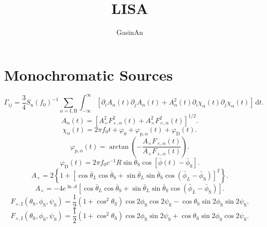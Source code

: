 \documentclass[a3paper]{ctexart}
\title{LISA}
\author{GasinAn}
\def\d{\mathrm{d}}
\begin{document}
    \maketitle
    \section{Monochromatic Sources}
    \begin{equation*}
        \Gamma_{ij}=\frac{3}{4}S_\text{n}(f_0)^{-1}\sum_{\alpha=\text{I},\text{II}}\int_{-\infty}^{\infty}\left[\partial_i A_\alpha(t)\partial_j A_\alpha(t)+A^2_\alpha(t)\partial_i \chi_\alpha(t)\partial_j \chi_\alpha(t)\right]\,\d t.
    \end{equation*}
    \begin{equation*}
        A_\alpha(t)=\left[A_+^2F_{+,\alpha}^2(t)+A_\times^2F_{\times,\alpha}^2(t)\right]^{1/2}.
    \end{equation*}
    \begin{equation*}
        \chi_\alpha(t)=2\pi f_0t+\varphi_0+\varphi_{\text{p},\alpha}(t)+\varphi_\text{D}(t).
    \end{equation*}
    \begin{equation*}
        \varphi_{\text{p},\alpha}(t)=\arctan\left(-\frac{A_\times F_{\times,\alpha}(t)}{A_+F_{+,\alpha}(t)}\right).
    \end{equation*}
    \begin{equation*}
        \varphi_\text{D}(t)=2\pi f_0c^{-1}R\sin\bar{\theta}_\text{S}\cos\left[\bar{\phi}(t)-\bar{\phi}_\text{S}\right].
    \end{equation*}
    \begin{equation*}
        A_+=2\left\{1+\left[\cos\bar{\theta}_L\cos\bar{\theta}_\text{S}+\sin\bar{\theta}_L\sin\bar{\theta}_\text{S}\cos(\bar{\phi}_L-\bar{\phi}_\text{S})\right]^2\right\}.
    \end{equation*}
    \begin{equation*}
        A_\times=-4e^{\ln\mathcal{A}}\left[\cos\bar{\theta}_L\cos\bar{\theta}_\text{S}+\sin\bar{\theta}_L\sin\bar{\theta}_\text{S}\cos(\bar{\phi}_L-\bar{\phi}_\text{S})\right].
    \end{equation*}
    \begin{equation*}
        F_{+,\text{I}}(\theta_\text{S},\phi_\text{S},\psi_\text{S})=\frac{1}{2}(1+\cos^2\theta_\text{S})\cos2\phi_\text{S}\cos2\psi_\text{S}-\cos\theta_\text{S}\sin2\phi_\text{S}\sin2\psi_\text{S}.
    \end{equation*}
    \begin{equation*}
        F_{\times,\text{I}}(\theta_\text{S},\phi_\text{S},\psi_\text{S})=\frac{1}{2}(1+\cos^2\theta_\text{S})\cos2\phi_\text{S}\sin2\psi_\text{S}+\cos\theta_\text{S}\sin2\phi_\text{S}\cos2\psi_\text{S}.
    \end{equation*}
\end{document}
